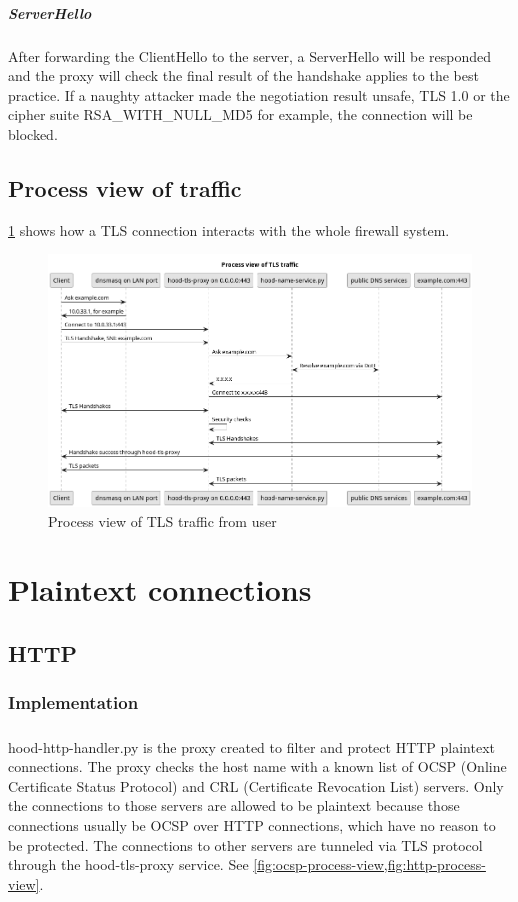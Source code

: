 \documentclass[mscthesis]{usiinfthesis}
\begin{document}
\paragraph{ServerHello} After forwarding the ClientHello to the server, a ServerHello will be responded and the proxy will check the final result of the handshake applies to the best practice. If a naughty attacker made the negotiation result unsafe, TLS 1.0 or the cipher suite RSA\_WITH\_NULL\_MD5 for example, the connection will be blocked.

\section{Process view of traffic}
\cref{fig:tls-process-view} shows how a TLS connection interacts with the whole firewall system.
\begin{figure}[H]
  \includegraphics[width=\textheight, angle=90]{graphics/puml/process-tls-traffic.png}
  \caption{Process view of TLS traffic from user}
  \label{fig:tls-process-view}
\end{figure}

\chapter{Plaintext connections}

\section{HTTP}
\subsection{Implementation}
\paragraph{}
hood-http-handler.py is the proxy created to filter and protect HTTP plaintext connections. The proxy checks the host name with a known list of OCSP (Online Certificate Status Protocol) and CRL (Certificate Revocation List) servers. Only the connections to those servers are allowed to be plaintext because those connections usually be OCSP over HTTP connections, which have no reason to be protected. The connections to other servers are tunneled via TLS protocol through the hood-tls-proxy service. See \cref{fig:ocsp-process-view,fig:http-process-view}.
\end{document}
